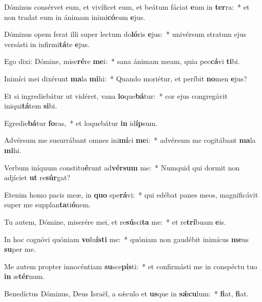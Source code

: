 \item Dóminus consérvet eum, et vivíficet eum, et beátum fáciat \textbf{e}um in \textbf{ter}ra:~* et non tradat eum in ánimam inimi\textbf{có}rum \textbf{e}jus.
\item Dóminus opem ferat illi super lectum do\textbf{ló}ris \textbf{e}jus:~* univérsum stratum ejus versásti in infirmi\textbf{tá}te \textbf{e}jus.
\item Ego dixi: Dómine, mise\textbf{ré}re \textbf{me}i:~* sana ánimam meam, quia pec\textbf{cá}vi \textbf{ti}bi.
\item Inimíci mei dixérunt \textbf{ma}la \textbf{mi}hi:~* Quando moriétur, et períbit \textbf{no}men \textbf{e}jus?
\item Et si ingrediebátur ut vidéret, vana \textbf{lo}que\textbf{bá}tur:~* cor ejus congregávit iniqui\textbf{tá}tem \textbf{si}bi.
\item Egredie\textbf{bá}tur \textbf{fo}ras,~* et loquebátur \textbf{in} id\textbf{íp}sum.
\item Advérsum me susurrábant omnes ini\textbf{mí}ci \textbf{me}i:~* advérsum me cogitábant \textbf{ma}la \textbf{mi}hi.
\item Verbum iníquum constitu\textbf{é}runt ad\textbf{vér}\textbf{sum} me:~* Numquid qui dormit non adjíciet \textbf{ut} re\textbf{súr}gat?
\item Etenim homo pacis meæ, in \textbf{quo} spe\textbf{rá}vi:~* qui edébat panes meos, magnificávit super me supplan\textbf{ta}ti\textbf{ó}nem.
\item Tu autem, Dómine, miserére mei, et re\textbf{sú}sci\textbf{ta} me:~* et re\textbf{trí}buam \textbf{e}is.
\item In hoc cognóvi quóniam \textbf{vo}lu\textbf{ís}\textbf{ti} me:~* quóniam non gaudébit inimícus \textbf{me}us \textbf{su}per me.
\item Me autem propter innocéntiam \textbf{su}sce\textbf{pís}ti:~* et confirmásti me in conspéctu tuo \textbf{in} æ\textbf{tér}num.
\item Benedíctus Dóminus, Deus Israël, a sǽculo et \textbf{us}que in \textbf{sǽ}\textbf{cu}lum:~* \textbf{fi}at, \textbf{fi}at.
